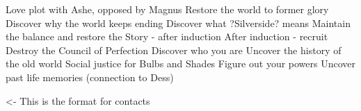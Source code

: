 \documentclass[char]{Silversiders}
\begin{document}
\name{\cWisdom{}}

Love plot with Ashe, opposed by Magnus
Restore the world to former glory
Discover why the world keeps ending
Discover what ?Silverside? means
Maintain the balance and restore the Story - after induction
After induction - recruit
Destroy the Council of Perfection
Discover who you are
Uncover the history of the old world
Social justice for Bulbs and Shades
Figure out your powers
Uncover past life memories (connection to Dess)

\begin{itemz}[Goals]
	\item 
\end{itemz}

\begin{itemz}[Notes]
	\item 
\end{itemz}

\begin{contacts}
	\contact{\cTest{}} <- This is the format for contacts 
\end{contacts}
\end{document}
